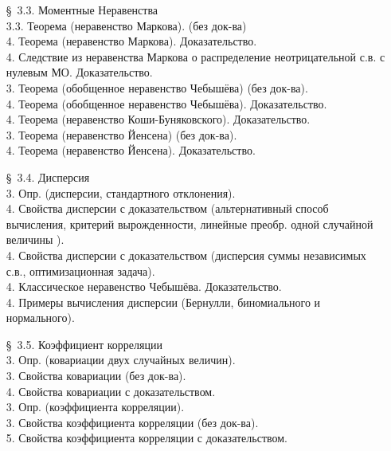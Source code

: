 \documentclass[10pt]{amsart}
\begin{document}
\begin{enumerate}
\begin{enumerate}
\item[\S\, 3.3.] Моментные Неравенства \\
3.3. Теорема (неравенство Маркова). (без док-ва) \\
4. Теорема (неравенство Маркова). Доказательство. \\
4. Следствие из неравенства Маркова о распределение неотрицательной с.в. с нулевым МО. Доказательство. \\
3. Теорема (обобщенное неравенство Чебышёва) (без док-ва). \\
4. Теорема (обобщенное неравенство Чебышёва). Доказательство. \\
4. Теорема (неравенство Коши-Буняковского). Доказательство. \\
3. Теорема (неравенство Йенсена) (без док-ва). \\
4. Теорема (неравенство Йенсена). Доказательство. \\

\item[\S\, 3.4.] Дисперсия \\
3. Опр. (дисперсии, стандартного отклонения). \\ 
4. Свойства дисперсии с доказательством (альтернативный способ вычисления, критерий вырожденности, линейные преобр. одной случайной величины ). \\ 
4. Свойства дисперсии с доказательством (дисперсия суммы независимых с.в., оптимизационная задача). \\ 
4. Классическое неравенство Чебышёва. Доказательство. \\
4. Примеры вычисления дисперсии (Бернулли, биномиального и нормального). \\
 
        
        
\item[\S\, 3.5.] Коэффициент корреляции \\
3. Опр. (ковариации двух случайных величин). \\
3. Свойства ковариации (без док-ва). \\
4. Свойства ковариации с доказательством. \\
3. Опр. (коэффициента корреляции). \\
3. Свойства коэффициента корреляции (без док-ва). \\
5. Свойства коэффициента корреляции с доказательством. \\



       
        


\end{enumerate}
\end{enumerate}
\end{document}
